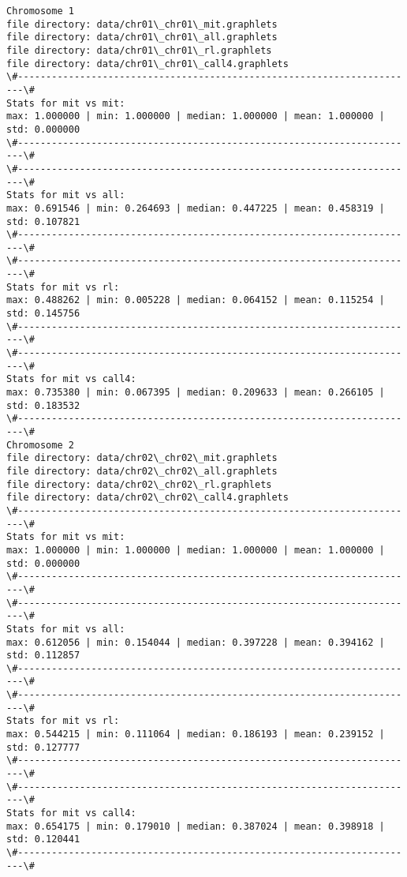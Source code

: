 \documentclass[11pt]{article}
\begin{document}
    \begin{Verbatim}[commandchars=\\\{\}]
Chromosome 1
file directory: data/chr01\_chr01\_mit.graphlets
file directory: data/chr01\_chr01\_all.graphlets
file directory: data/chr01\_chr01\_rl.graphlets
file directory: data/chr01\_chr01\_call4.graphlets
\#-----------------------------------------------------------------------\#
Stats for mit vs mit: 
max: 1.000000 | min: 1.000000 | median: 1.000000 | mean: 1.000000 | std: 0.000000
\#-----------------------------------------------------------------------\#
\#-----------------------------------------------------------------------\#
Stats for mit vs all: 
max: 0.691546 | min: 0.264693 | median: 0.447225 | mean: 0.458319 | std: 0.107821
\#-----------------------------------------------------------------------\#
\#-----------------------------------------------------------------------\#
Stats for mit vs rl: 
max: 0.488262 | min: 0.005228 | median: 0.064152 | mean: 0.115254 | std: 0.145756
\#-----------------------------------------------------------------------\#
\#-----------------------------------------------------------------------\#
Stats for mit vs call4: 
max: 0.735380 | min: 0.067395 | median: 0.209633 | mean: 0.266105 | std: 0.183532
\#-----------------------------------------------------------------------\#
Chromosome 2
file directory: data/chr02\_chr02\_mit.graphlets
file directory: data/chr02\_chr02\_all.graphlets
file directory: data/chr02\_chr02\_rl.graphlets
file directory: data/chr02\_chr02\_call4.graphlets
\#-----------------------------------------------------------------------\#
Stats for mit vs mit: 
max: 1.000000 | min: 1.000000 | median: 1.000000 | mean: 1.000000 | std: 0.000000
\#-----------------------------------------------------------------------\#
\#-----------------------------------------------------------------------\#
Stats for mit vs all: 
max: 0.612056 | min: 0.154044 | median: 0.397228 | mean: 0.394162 | std: 0.112857
\#-----------------------------------------------------------------------\#
\#-----------------------------------------------------------------------\#
Stats for mit vs rl: 
max: 0.544215 | min: 0.111064 | median: 0.186193 | mean: 0.239152 | std: 0.127777
\#-----------------------------------------------------------------------\#
\#-----------------------------------------------------------------------\#
Stats for mit vs call4: 
max: 0.654175 | min: 0.179010 | median: 0.387024 | mean: 0.398918 | std: 0.120441
\#-----------------------------------------------------------------------\#

\end{Verbatim}
\end{document}
